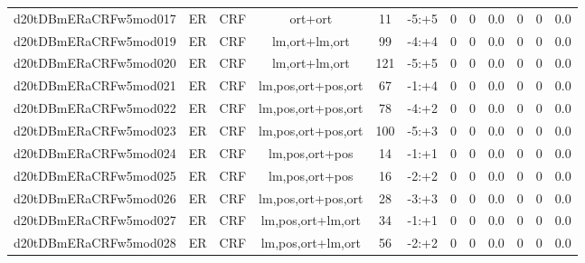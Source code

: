 \documentclass[a4paper]{article}
\begin{document}
\begin{landscape}
\begin{center}
\begin{tabular}{ |c|c|c|c|c|c|c|c|c|c|c|c|}
 
 	
 	\small{ d20tDBmERaCRFw5mod017 } & ER & CRF & ort+ort  &  11 &  -5:+5  &  0 & 0 & 0.0  &  0 & 0 & 0.0 \\
 	

 
 	
 	\small{ d20tDBmERaCRFw5mod019 } & ER & CRF & lm,ort+lm,ort  &  99 &  -4:+4  &  0 & 0 & 0.0  &  0 & 0 & 0.0 \\
 	

 
 	
 	\small{ d20tDBmERaCRFw5mod020 } & ER & CRF & lm,ort+lm,ort  &  121 &  -5:+5  &  0 & 0 & 0.0  &  0 & 0 & 0.0 \\
 	

 
 	
 	\small{ d20tDBmERaCRFw5mod021 } & ER & CRF & lm,pos,ort+pos,ort  &  67 &  -1:+4  &  0 & 0 & 0.0  &  0 & 0 & 0.0 \\
 	

 
 	
 	\small{ d20tDBmERaCRFw5mod022 } & ER & CRF & lm,pos,ort+pos,ort  &  78 &  -4:+2  &  0 & 0 & 0.0  &  0 & 0 & 0.0 \\
 	

 
 	
 	\small{ d20tDBmERaCRFw5mod023 } & ER & CRF & lm,pos,ort+pos,ort  &  100 &  -5:+3  &  0 & 0 & 0.0  &  0 & 0 & 0.0 \\
 	

 
 	
 	\small{ d20tDBmERaCRFw5mod024 } & ER & CRF & lm,pos,ort+pos  &  14 &  -1:+1  &  0 & 0 & 0.0  &  0 & 0 & 0.0 \\
 	

 
 	
 	\small{ d20tDBmERaCRFw5mod025 } & ER & CRF & lm,pos,ort+pos  &  16 &  -2:+2  &  0 & 0 & 0.0  &  0 & 0 & 0.0 \\
 	

 
 	
 	\small{ d20tDBmERaCRFw5mod026 } & ER & CRF & lm,pos,ort+pos,ort  &  28 &  -3:+3  &  0 & 0 & 0.0  &  0 & 0 & 0.0 \\
 	

 
 	
 	\small{ d20tDBmERaCRFw5mod027 } & ER & CRF & lm,pos,ort+lm,ort  &  34 &  -1:+1  &  0 & 0 & 0.0  &  0 & 0 & 0.0 \\
 	

 
 	
 	\small{ d20tDBmERaCRFw5mod028 } & ER & CRF & lm,pos,ort+lm,ort  &  56 &  -2:+2  &  0 & 0 & 0.0  &  0 & 0 & 0.0 \\
 	


\end{tabular}
\end{center}
\end{landscape}
\end{document}
